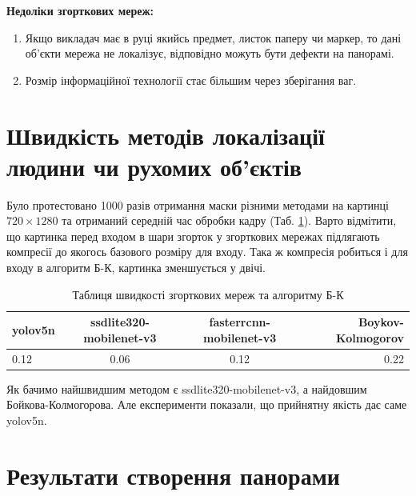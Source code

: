 \textbf{Недоліки згорткових мереж:}
\begin{enumerate}
    \item Якщо викладач має в руці якийсь предмет, листок паперу чи маркер, то дані
          об'єкти мережа не локалізує, відповідно можуть бути дефекти на панорамі.
    \item Розмір інформаційної технології стає більшим через зберігання ваг.
\end{enumerate}


\section{Швидкість методів локалізації людини чи рухомих об'єктів}

Було протестовано 1000 разів отримання маски різними методами на картинці $720 \times 1280$ та
отриманий середній час обробки кадру (Таб. \ref{tab:speed_methods_table}).
Варто відмітити, що картинка перед входом в шари згорток у згорткових мережах підлягають
компресії до якогось базового розміру для входу. Така ж компресія робиться і для входу
в алгоритм Б-К, картинка зменшується у двічі.

\begin{table}[H]
    \begin{center}
        \caption{Таблиця швидкості згорткових мереж та алгоритму Б-К}
        \label{tab:speed_methods_table}
        \begin{tabular}{l|c|c|r}
            \textbf{yolov5n} & \textbf{ssdlite320-mobilenet-v3} & \textbf{fasterrcnn-mobilenet-v3} & \textbf{Boykov-Kolmogorov} \\
            \hline
            0.12             & 0.06                             & 0.12                             & 0.22                       \\
        \end{tabular}
    \end{center}
\end{table}


Як бачимо найшвидшим методом є ssdlite320-mobilenet-v3, а найдовшим Бойкова-Колмогорова.
Але експерименти показали, що прийнятну якість дає саме yolov5n.

\section{Результати створення панорами}


